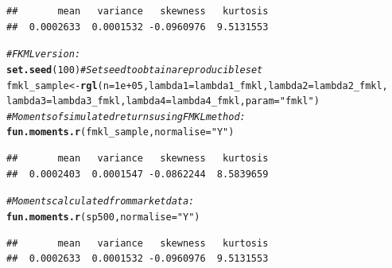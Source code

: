 \documentclass[12pt, a4paper, oneside]{article}\usepackage[]{graphicx}\usepackage[]{color}
\makeatletter
\newcommand{\hlnum}[1]{\textcolor[rgb]{0.686,0.059,0.569}{#1}}%
\newcommand{\hlstr}[1]{\textcolor[rgb]{0.192,0.494,0.8}{#1}}%
\newcommand{\hlcom}[1]{\textcolor[rgb]{0.678,0.584,0.686}{\textit{#1}}}%
\newcommand{\hlstd}[1]{\textcolor[rgb]{0.345,0.345,0.345}{#1}}%
\newcommand{\hlkwb}[1]{\textcolor[rgb]{0.69,0.353,0.396}{#1}}%
\newcommand{\hlkwc}[1]{\textcolor[rgb]{0.333,0.667,0.333}{#1}}%
\newcommand{\hlkwd}[1]{\textcolor[rgb]{0.737,0.353,0.396}{\textbf{#1}}}%
\newenvironment{kframe}{%
 \def\at@end@of@kframe{}%
 \ifinner\ifhmode%
  \def\at@end@of@kframe{\end{minipage}}%
  \begin{minipage}{\columnwidth}%
 \fi\fi%
 \def\FrameCommand##1{\hskip\@totalleftmargin \hskip-\fboxsep
 \colorbox{shadecolor}{##1}\hskip-\fboxsep
     \hskip-\linewidth \hskip-\@totalleftmargin \hskip\columnwidth}%
 \MakeFramed {\advance\hsize-\width
   \@totalleftmargin\z@ \linewidth\hsize
   \@setminipage}}%
 {\par\unskip\endMakeFramed%
 \at@end@of@kframe}
\newenvironment{knitrout}{}{} %
\makeatother
\begin{document}
\begin{knitrout}
\begin{kframe}
\begin{verbatim}
##       mean   variance   skewness   kurtosis 
##  0.0002633  0.0001532 -0.0960976  9.5131553
\end{verbatim}
\begin{alltt}
\hlcom{# FKML version:}
\hlkwd{set.seed}\hlstd{(}\hlnum{100}\hlstd{)}  \hlcom{# Set seed to obtain a reproducible set}
\hlstd{fmkl_sample} \hlkwb{<-} \hlkwd{rgl}\hlstd{(}\hlkwc{n} \hlstd{=} \hlnum{1e+05}\hlstd{,} \hlkwc{lambda1} \hlstd{= lambda1_fmkl,} \hlkwc{lambda2} \hlstd{= lambda2_fmkl,}
    \hlkwc{lambda3} \hlstd{= lambda3_fmkl,} \hlkwc{lambda4} \hlstd{= lambda4_fmkl,} \hlkwc{param} \hlstd{=} \hlstr{"fmkl"}\hlstd{)}
\hlcom{# Moments of simulated returns using FMKL method:}
\hlkwd{fun.moments.r}\hlstd{(fmkl_sample,} \hlkwc{normalise} \hlstd{=} \hlstr{"Y"}\hlstd{)}
\end{alltt}
\begin{verbatim}
##       mean   variance   skewness   kurtosis 
##  0.0002403  0.0001547 -0.0862244  8.5839659
\end{verbatim}
\begin{alltt}
\hlcom{# Moments calculated from market data:}
\hlkwd{fun.moments.r}\hlstd{(sp500,} \hlkwc{normalise} \hlstd{=} \hlstr{"Y"}\hlstd{)}
\end{alltt}
\begin{verbatim}
##       mean   variance   skewness   kurtosis 
##  0.0002633  0.0001532 -0.0960976  9.5131553
\end{verbatim}
\end{kframe}
\end{knitrout}
\end{document}
